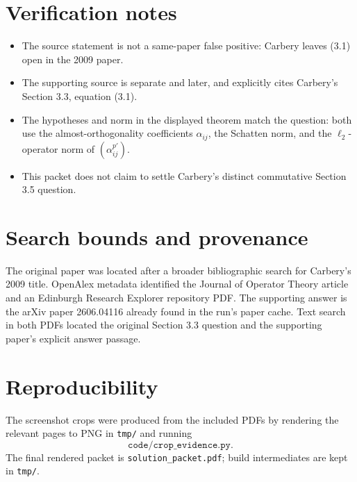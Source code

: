 \documentclass[11pt]{article}
\begin{document}
\section*{Verification notes}

\begin{itemize}
\item The source statement is not a same-paper false positive: Carbery leaves
  (3.1) open in the 2009 paper.
\item The supporting source is separate and later, and explicitly cites
  Carbery's Section 3.3, equation (3.1).
\item The hypotheses and norm in the displayed theorem match the question:
  both use the almost-orthogonality coefficients \(\alpha_{ij}\), the
  Schatten norm, and the \(\ell_2\)-operator norm of
  \((\alpha_{ij}^{p'})\).
\item This packet does not claim to settle Carbery's distinct commutative
  Section 3.5 question.
\end{itemize}

\section*{Search bounds and provenance}

The original paper was located after a broader bibliographic search for
Carbery's 2009 title. OpenAlex metadata identified the Journal of Operator
Theory article and an Edinburgh Research Explorer repository PDF. The
supporting answer is the arXiv paper 2606.04116 already found in the run's
paper cache. Text search in both PDFs located the original Section 3.3
question and the supporting paper's explicit answer passage.

\section*{Reproducibility}

The screenshot crops were produced from the included PDFs by rendering the
relevant pages to PNG in \texttt{tmp/} and running
\[
\texttt{code/crop\_evidence.py}.
\]
The final rendered packet is \texttt{solution\_packet.pdf}; build
intermediates are kept in \texttt{tmp/}.
\end{document}
